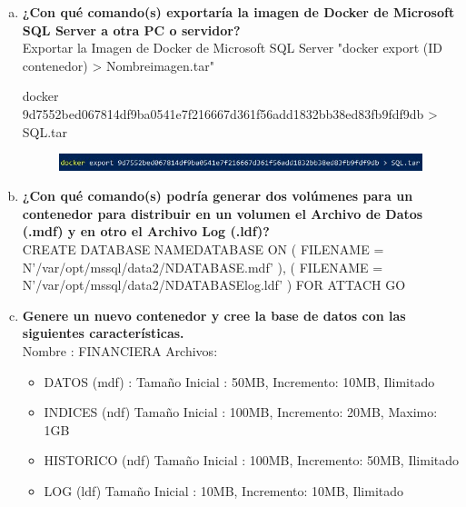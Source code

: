 \documentclass[preprint,12pt]{elsarticle}
\begin{document}
\begin{enumerate}[a)]
\item \textbf{¿Con qué comando(s) exportaría la imagen de Docker de Microsoft SQL Server a otra PC o servidor?}\newline
\\Exportar la Imagen de Docker de Microsoft SQL Server
"docker export (ID contenedor) >  Nombreimagen.tar"
\begin{center} docker 9d7552bed067814df9ba0541e7f216667d361f56add1832bb38ed83fb9fdf9db > SQL.tar \end{center}
\begin{figure}[htb]
	\begin{center}
		\includegraphics[width=14cm]{./IMAGENES/Docker17}
	\end{center}
\end{figure}
\item \textbf{¿Con qué comando(s) podría generar dos volúmenes para un contenedor para distribuir en un volumen el Archivo de Datos (.mdf) y en otro el Archivo Log (.ldf)?}\newline
\\CREATE DATABASE NAMEDATABASE ON \newline
( FILENAME = N'/var/opt/mssql/data2/NDATABASE.mdf' ),\newline
( FILENAME = N'/var/opt/mssql/data2/NDATABASElog.ldf' )\newline
FOR ATTACH\newline
GO\newline

\item \textbf{Genere un nuevo contenedor y cree la base de datos con las siguientes características.}\newline
\\Nombre : FINANCIERA \newline
Archivos:
\begin{itemize}
\item DATOS (mdf) : Tamaño Inicial : 50MB, Incremento: 10MB, Ilimitado
\item INDICES (ndf) Tamaño Inicial : 100MB, Incremento: 20MB, Maximo: 1GB
\item HISTORICO (ndf) Tamaño Inicial : 100MB, Incremento: 50MB, Ilimitado
\item LOG (ldf) Tamaño Inicial : 10MB, Incremento: 10MB, Ilimitado
\end{itemize}


\end{enumerate}
\end{document}
